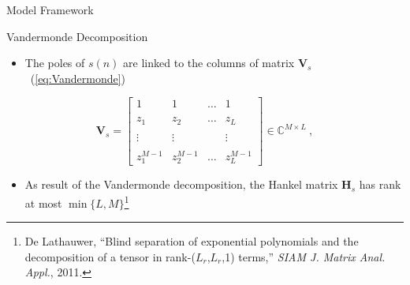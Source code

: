 \documentclass{beamer}
\begin{document}
	\begin{frame}{Model Framework}
    
        \begin{block}{Vandermonde Decomposition}
    		\begin{itemize}
       		    \item The poles of $s(n)$ are linked to the columns of matrix ${\mathbf{V}}_s$~(\ref{eq:Vandermonde})
    		\end{itemize}
        \end{block}

        \vspace{-10pt}
  
        \begin{equation}
            {\mathbf{V}}_s = \left[ \begin{array}{cccc}
            1 & 1 & \dots & 1 \\\\
            z_{1} & z_{2} & \dots & z_{L} \\\\
            \vdots & \vdots &  & \vdots \\\\
            z_{1}^{M-1} & z_{2}^{M-1} & \dots & z_{L}^{M-1}
            \end{array} \right] \in \mathbb{C}^{M \times L} \ , \label{eq:Vandermonde}
        \end{equation}
        
        \begin{itemize}
            \item As result of the Vandermonde decomposition, the Hankel matrix ${\mathbf{H}}_s$ has rank at most $\min\{L,M\}$\footnote{De Lathauwer, ``Blind separation of exponential polynomials and the decomposition of a tensor in rank-($L_{r}$,$L_{r}$,1) terms,'' \textit{SIAM J. Matrix Anal. Appl.}, 2011.}
        \end{itemize}

	\end{frame}	
    
\end{document}

